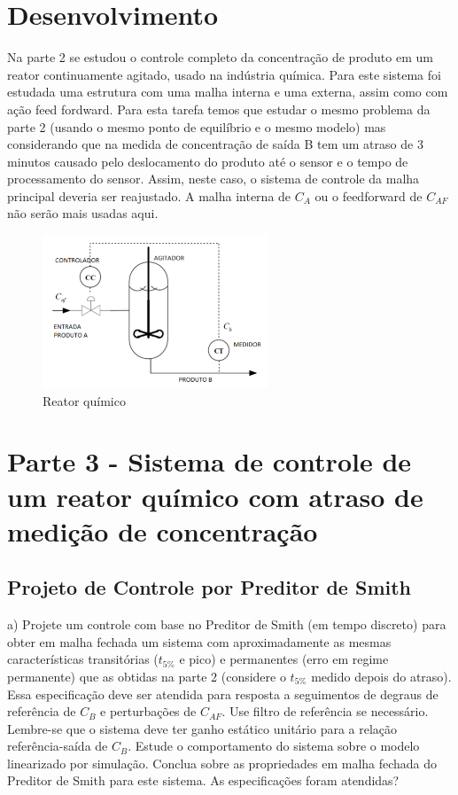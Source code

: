 \documentclass[a4paper,12pt]{article}
\begin{document}
\newpage

\section{Desenvolvimento}
\label{chap:desenvolvimento}

Na parte 2 se estudou o controle completo da concentração de produto em um reator 
continuamente agitado, usado na indústria química. Para este sistema foi estudada uma 
estrutura com uma malha interna e uma externa, assim como com ação feed fordward.
Para esta tarefa temos que estudar o mesmo problema da parte 2 (usando o mesmo ponto 
de equilíbrio e o mesmo modelo) mas considerando que na medida de concentração de saída 
B tem um atraso de 3 minutos causado pelo deslocamento do produto até o sensor e o tempo 
de processamento do sensor. Assim, neste caso, o sistema de controle da malha principal 
deveria ser reajustado. A malha interna de \(C_A\) ou o feedforward de \(C_{AF}\) não serão mais usadas 
aqui.

 \begin{figure}[ht]
  \centering
  \includegraphics[width=0.6\textwidth]{Imagens/Reator.png}
  \caption{Reator químico}
  \end{figure}

\newpage

\section{Parte 3 -  Sistema de controle de um reator químico com atraso de medição de concentração}

\subsection{Projeto de Controle por Preditor de Smith}

a) Projete um controle com base no Preditor de Smith (em tempo discreto) para obter em malha fechada um sistema com aproximadamente as mesmas características transitórias (\(t_{5\%}\) e pico) e permanentes (erro em regime permanente) que as obtidas na parte 2 (considere o \(t_{5\%}\) medido depois do atraso). Essa especificação deve ser atendida para resposta a seguimentos de degraus de referência de \(C_B\) e perturbações de \(C_{AF}\). Use filtro de referência se necessário. Lembre-se que o sistema deve ter ganho estático unitário para a relação referência-saída de \(C_B\). Estude o comportamento do sistema sobre o modelo linearizado por simulação. Conclua sobre as propriedades em malha fechada do Preditor de Smith para este sistema. As especificações foram atendidas?\\
\end{document}
